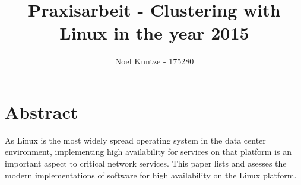 \documentclass[a4paper]{scrartcl}
\newcommand*\BlankPage{\newpage\null\thispagestyle{empty}\newpage}
\begin{document}
\title{Praxisarbeit - Clustering with Linux in the year 2015}
\author{Noel Kuntze - 175280}
\maketitle

\BlankPage

{}

\section*{Abstract}
As Linux is the most widely spread operating system in the data center environment,
implementing high availability for services on that platform is an important aspect to
critical network services. This paper lists and asesses the modern implementations
of software for high availability on the Linux platform.

\cleardoublepage
{}

\listoffigures

\cleardoublepage
\end{document}
